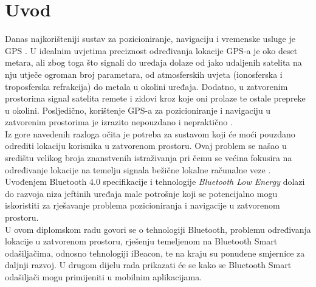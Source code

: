 \chapter{Uvod}

Danas najkorišteniji sustav za pozicioniranje, navigaciju i vremenske usluge je GPS . 
U idealnim uvjetima preciznost određivanja lokacije GPS-a je oko deset metara, ali zbog toga što signali do uređaja dolaze od jako udaljenih satelita na nju utječe ogroman broj parametara, od atmosferskih uvjeta (ionosferska i troposferska refrakcija) do metala u okolini uređaja. %
Dodatno, u zatvorenim prostorima signal satelita remete i zidovi kroz koje oni prolaze te ostale prepreke u okolini.
Posljedično, korištenje GPS-a za pozicioniranje i navigaciju u zatvorenim prostorima je izrazito nepouzdano i nepraktično \citep{schneider2013}.
\\

Iz gore navedenih razloga očita je potreba za sustavom koji će moći pouzdano odrediti lokaciju korisnika u zatvorenom prostoru. 
Ovaj problem se našao u središtu velikog broja znanstvenih istraživanja pri čemu se većina fokusira na određivanje lokacije na temelju signala bežične lokalne računalne veze . %
Uvođenjem Bluetooth 4.0 specifikacije i tehnologije \textit{Bluetooth Low Energy} dolazi do razvoja niza jeftinih uređaja male potrošnje koji se potencijalno mogu iskoristiti za rješavanje problema pozicioniranja i navigacije u zatvorenom prostoru.
\\

U ovom diplomskom radu govori se o tehnologiji Bluetooth, problemu određivanja lokacije u zatvorenom prostoru, rješenju temeljenom na Bluetooth Smart odašiljačima, odnosno tehnologiji iBeacon, te na kraju su ponuđene smjernice za daljnji razvoj. 
U drugom dijelu rada prikazati će se kako se Bluetooth Smart odašiljači mogu primijeniti u mobilnim aplikacijama.